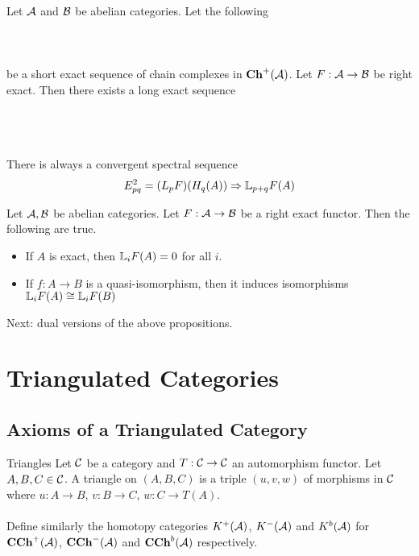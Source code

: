 \documentclass[a4paper]{article}
\begin{document}
\begin{lmm}{}{} Let $\mathcal{A}$ and $\mathcal{B}$ be abelian categories. Let the following \\~\\
\\~\\
be a short exact sequence of chain complexes in $\bold{Ch}^+(\mathcal{A})$. Let $F:\mathcal{A}\to\mathcal{B}$ be right exact. Then there exists a long exact sequence \\~\\
\\~\\
\end{lmm}

\begin{prp}{}{} There is always a convergent spectral sequence $$E_{pq}^2=(L_pF)(H_q(A))\Rightarrow\mathbb{L}_{p+q}F(A)$$
\end{prp}

\begin{crl}{}{} Let $\mathcal{A},\mathcal{B}$ be abelian categories. Let $F:\mathcal{A}\to\mathcal{B}$ be a right exact functor. Then the following are true. 
\begin{itemize}
\item If $A$ is exact, then $\mathbb{L}_iF(A)=0$ for all $i$. 
\item If $f:A\to B$ is a quasi-isomorphism, then it induces isomorphisms $\mathbb{L}_iF(A)\cong\mathbb{L}_iF(B)$
\end{itemize}
\end{crl}

Next: dual versions of the above propositions. 

\pagebreak
\section{Triangulated Categories}
\subsection{Axioms of a Triangulated Category}
\begin{defn}{Triangles}{} Let $\mathcal{C}$ be a category and $T:\mathcal{C}\to\mathcal{C}$ an automorphism functor. Let $A,B,C\in\mathcal{C}$. A triangle on $(A,B,C)$ is a triple $(u,v,w)$ of morphisms in $\mathcal{C}$ where $u:A\to B$, $v:B\to C$, $w:C\to T(A)$. \\~\\

Define similarly the homotopy categories $K^+(\mathcal{A})$, $K^-(\mathcal{A})$ and $K^b(\mathcal{A})$ for $\bold{CCh}^+(\mathcal{A})$, $\bold{CCh}^-(\mathcal{A})$ and $\bold{CCh}^b(\mathcal{A})$ respectively. 
\end{defn}
\end{document}
